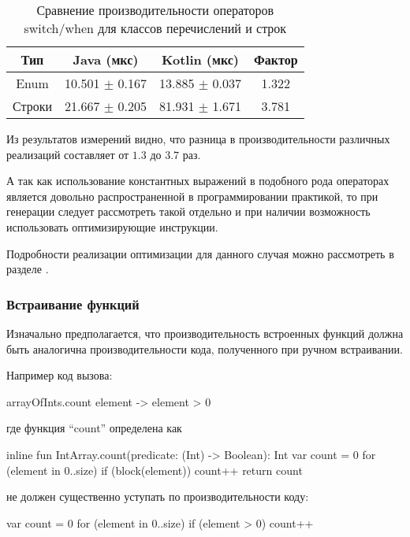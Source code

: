\begin{table}[h]
\begin{center}
\begin{tabular}{|c|c|c|c|} \hline
Тип & Java (мкс) & Kotlin (мкс) & Фактор \\ \hline
Enum & 10.501 $\pm$ 0.167 & 13.885 $\pm$ 0.037 & 1.322\\ \hline
Строки & 21.667 $\pm$ 0.205 & 81.931 $\pm$ 1.671 & 3.781\\ \hline
\end{tabular}
\caption{Сравнение производительности операторов switch/when для классов перечислений и строк}
\end{center}
\end{table}

Из результатов измерений видно, что разница в производительности различных реализаций
составляет от $1.3$ до $3.7$ раз.

А так как использование константных выражений в подобного рода операторах является довольно
распространенной в программировании практикой, то при генерации следует рассмотреть такой
отдельно и при наличии возможность использовать оптимизирующие инструкции.

Подробности реализации оптимизации для данного случая можно рассмотреть в разделе . %

\subsubsection{Встраивание функций}
\label{section:inline:bm}
Изначально предполагается, что производительность встроенных функций должна быть аналогична
производительности кода, полученного при ручном встраивании.

Например код вызова:
\begin{pyglist}[language=kotlin]
    arrayOfInts.count { element -> element > 0 }
\end{pyglist}

где функция ``count'' определена как
\begin{pyglist}[language=kotlin]
    inline fun IntArray.count(predicate: (Int) -> Boolean): Int {
        var count = 0
        for (element in 0..size) {
            if (block(element)) {
                count++
            }
        }
        return count
    }
\end{pyglist}
не должен существенно уступать по производительности коду:
\begin{pyglist}[language=kotlin]
        var count = 0
        for (element in 0..size) {
            if (element > 0) {
                count++
            }
        }
\end{pyglist}

